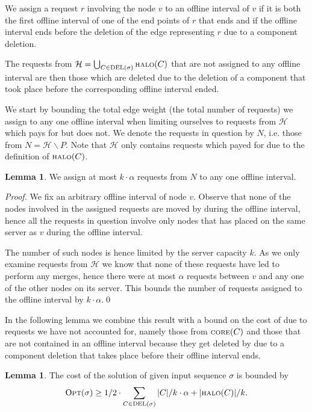 \documentclass[a4paper,xcolor=dvipsnames, tikz, 12pt]{article}
\newcommand{\nl}{\newline}
\newcommand{\crep}{\text{C{\scriptsize REP}}}
\newcommand{\del}{\text{\scriptsize DEL}}
\newcommand{\opt}{\text{O{\scriptsize PT}}}
\newcommand{\core}{\text{\scriptsize CORE}}
\newcommand{\halo}{\text{\scriptsize HALO}}
\theoremstyle{definition}
\newtheorem{lemma}[defi]{Lemma}
\begin{document}
We assign a request $r$ involving the node $v$ to an offline interval of $v$ if it is both the first offline interval of one of the end points of $r$ that ends and if the offline interval ends before the deletion of the edge representing $r$ due to a component deletion.

The requests from $\mathcal{H}=\bigcup_{C\in\del{}(\sigma)}\halo{}(C)$ that are not assigned to any offline interval are then those which are deleted due to the deletion of a component that took place before the corresponding offline interval ended.

We start by bounding the total edge weight (the total number of requests) we assign to any one offline interval when limiting ourselves to requests from $\mathcal{H}$ which \crep{} pays for but \opt{} does not. We denote the requests in question by $N$, i.e. those from $N=\mathcal{H}\backslash P$. Note that $\mathcal{H}$ only contains requests which \crep{} payed for due to the definition of $\halo(C)$.


\begin{lemma}
	We assign at most $k\cdot\alpha$ requests from $N$ to any one offline interval.
\end{lemma}

\textit{Proof.} We fix an arbitrary offline interval of node $v$. Observe that none of the nodes involved in the assigned requests are moved by \opt{} during the offline interval, hence all the requests in question involve only nodes that \opt{} has placed on the same server as $v$ during the offline interval. 

The number of such nodes is hence limited by the server capacity $k$. As we only examine requests from $\mathcal{H}$ we know that none of these requests have led \crep{} to perform any merges, hence there were at most $\alpha$ requests between $v$ and any one of the other nodes on its server. This bounds the number of requests assigned to the offline interval by $k\cdot\alpha$.\qed\nl

In the following lemma we combine this result with a bound on the cost of \opt{} due to requests we have not accounted for, namely those from $\core(C)$ and those that are not contained in an offline interval because they get deleted by \crep{} due to a component deletion that takes place before their offline interval ends.


\begin{lemma}
	\label{opt_lower_bound}
	The cost of the solution of \opt{} given input sequence $\sigma$ is bounded by
	\begin{align*}
	\opt{}(\sigma)\geq1/2\cdot\sum_{C\in\del{}(\sigma)}|C|/k\cdot\alpha+|\halo(C)|/k.
	\end{align*}
\end{lemma}
\end{document}
